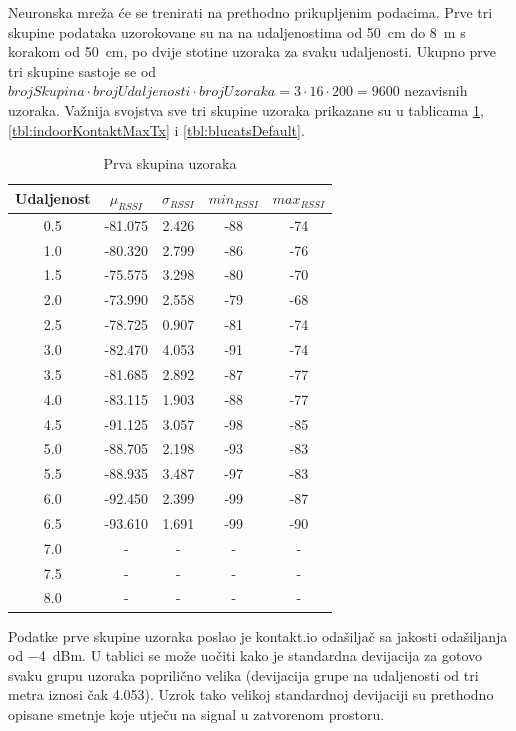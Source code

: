 Neuronska mreža će se trenirati na prethodno prikupljenim podacima. 
Prve tri skupine podataka uzorokovane su na na udaljenostima od \SI{50}{cm} do \SI{8}{m} s korakom od \SI{50}{cm}, po dvije stotine uzoraka za svaku udaljenosti. 
Ukupno prve tri skupine sastoje se od $brojSkupina \cdot brojUdaljenosti \cdot brojUzoraka = 3 \cdot 16 \cdot 200 = 9600$ nezavisnih uzoraka. 
Važnija svojstva sve tri skupine uzoraka prikazane su u tablicama \ref{tbl:indoorKontaktDefaultTx}, \ref{tbl:indoorKontaktMaxTx} i \ref{tbl:blucatsDefault}.

\begin{table}[H]
	\centering
	\caption{Prva skupina uzoraka}
	\label{tbl:indoorKontaktDefaultTx}
	\begin{tabular}{ccccc}
	\hline
	Udaljenost & $\mu_{RSSI}$ & $\sigma_{RSSI}$ & $min_{RSSI}$ & $max_{RSSI}$ \\
	\hline
	0.5 & -81.075 & 2.426 & -88 & -74 \\
	1.0 & -80.320 & 2.799 & -86 & -76 \\
	1.5 & -75.575 & 3.298 & -80 & -70 \\
	2.0 & -73.990 & 2.558 & -79 & -68 \\
	2.5 & -78.725 & 0.907 & -81 & -74 \\
	3.0 & -82.470 & 4.053 & -91 & -74 \\
	3.5 & -81.685 & 2.892 & -87 & -77 \\
	4.0 & -83.115 & 1.903 & -88 & -77 \\
	4.5 & -91.125 & 3.057 & -98 & -85 \\
	5.0 & -88.705 & 2.198 & -93 & -83 \\
	5.5 & -88.935 & 3.487 & -97 & -83 \\
	6.0 & -92.450 & 2.399 & -99 & -87 \\
	6.5 & -93.610 & 1.691 & -99 & -90 \\
	7.0 & - & - & - & - \\
	7.5 & - & - & - & - \\
	8.0 & - & - & - & - \\
	\hline
	\end{tabular}
\end{table}

Podatke prve skupine uzoraka poslao je kontakt.io odašiljač sa jakosti odašiljanja od \SI{-4}{dBm}. 
U tablici se može uočiti kako je standardna devijacija za gotovo svaku grupu uzoraka poprilično velika (devijacija grupe na udaljenosti od tri metra iznosi čak 4.053). 
Uzrok tako velikoj standardnoj devijaciji su prethodno opisane smetnje koje utječu na signal u zatvorenom prostoru.


